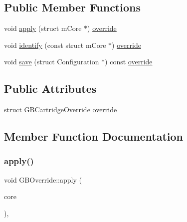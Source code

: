 \subsection*{Public Member Functions}
\begin{DoxyCompactItemize}
\item 
void \mbox{\hyperlink{class_q_g_b_a_1_1_g_b_override_a0b0437da44fc94de35887d80440bf089}{apply}} (struct m\+Core $\ast$) \mbox{\hyperlink{class_q_g_b_a_1_1_g_b_override_aa3a3f70ba43a85f93c3e6fc210595940}{override}}
\item 
void \mbox{\hyperlink{class_q_g_b_a_1_1_g_b_override_a287ae6b1d0a643f36652f72e22a1483e}{identify}} (const struct m\+Core $\ast$) \mbox{\hyperlink{class_q_g_b_a_1_1_g_b_override_aa3a3f70ba43a85f93c3e6fc210595940}{override}}
\item 
void \mbox{\hyperlink{class_q_g_b_a_1_1_g_b_override_ad14c3a566eeeee641c4c78068b483ace}{save}} (struct Configuration $\ast$) const \mbox{\hyperlink{class_q_g_b_a_1_1_g_b_override_aa3a3f70ba43a85f93c3e6fc210595940}{override}}
\end{DoxyCompactItemize}
\subsection*{Public Attributes}
\begin{DoxyCompactItemize}
\item 
struct G\+B\+Cartridge\+Override \mbox{\hyperlink{class_q_g_b_a_1_1_g_b_override_aa3a3f70ba43a85f93c3e6fc210595940}{override}}
\end{DoxyCompactItemize}


\subsection{Member Function Documentation}
\mbox{\label{class_q_g_b_a_1_1_g_b_override_a0b0437da44fc94de35887d80440bf089}} 
\subsubsection{\texorpdfstring{apply()}{apply()}}
{\footnotesize\ttfamily void G\+B\+Override\+::apply (\begin{DoxyParamCaption}\item[{struct m\+Core $\ast$}]{core }\end{DoxyParamCaption})\hspace{0.3cm}{\ttfamily [override]}, {\ttfamily [virtual]}}



